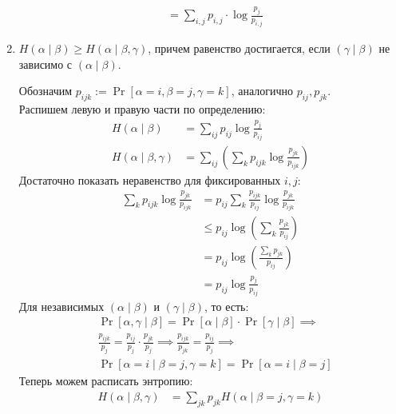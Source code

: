 \begin{prop}
\begin{enumerate}
\begin{proof*}
\begin{align*}
    				&= \sum_{i, j}^{} p_{i,j} \cdot \log \frac{p_{j}}{p_{i, j}}
    			\end{align*}
			\end{proof*}
		\item $ H( \alpha \mid \beta) \ge H( \alpha  \mid \beta, \gamma ) $, причем равенство достигается, если $(\gamma \mid \beta)$ не зависимо с $(\alpha \mid \beta)$.
		    \begin{proof*}
		        Обозначим $ p_{ijk} := \Pr[\alpha = i, \beta = j, \gamma = k]$, аналогично $ p_{ij}, p_{jk}$.\\
		        Распишем левую и правую части по определению:
		        \begin{align*}
		            H(\alpha \mid \beta) &= \sum_{ij} p_{ij} \log \frac{p_j}{p_{ij}} \\
		            H(\alpha \mid \beta, \gamma) &= \sum_{ij} \left( \sum_k p_{ijk} \log \frac{p_{jk}}{p_{ijk}} \right)
		        \end{align*}
		        Достаточно показать неравенство для фиксированных $ i, j$:
		        \begin{align*}
		            \sum_k p_{ijk} \log \frac{p_{jk}}{p_{ijk}} 
		            &= p_{ij} \sum_k \frac{p_{ijk}}{p_{ij}} \log \frac{p_{jk}}{p_{ijk}}
		            \tag{чтобы сумма коэффициентов была 1} \\
		            &\le p_{ij} \log \left( \sum_k \frac{p_{jk}}{p_{ij}} \right)
		            \tag{по неравенству Йенсена} \\
		            &= p_{ij} \log \left( \frac{ \sum_k p_{jk}}{p_{ij}} \right) \\
		            &= p_{ij} \log \frac{p_j}{p_{ij}}
		        \end{align*}
		        Для независимых $ (\alpha \mid \beta)$ и $(\gamma \mid \beta)$, то есть:
		        \begin{align*}
		            &\Pr[\alpha, \gamma \mid \beta] = \Pr[\alpha \mid \beta] \cdot \Pr[\gamma \mid \beta] \implies\\
		            &\frac{p_{ijk}}{p_{j}} = \frac{p_{ij}}{p_j}\cdot\frac{p_{jk}}{p_j} \implies \frac{p_{ijk}}{p_{jk}} = \frac{p_{ij}}{p_j} \implies\\
		          &\Pr[\alpha = i \mid \beta = j, \gamma = k] = \Pr[\alpha = i \mid \beta = j]
		        \end{align*}
		        Теперь можем расписать энтропию:
		        \begin{align*}
		            H(\alpha \mid \beta, \gamma) 
		            &= \sum_{jk} p_{jk} H(\alpha \mid \beta = j, \gamma = k) \\

\end{align*}
\end{proof*}
\end{enumerate}
\end{prop}

